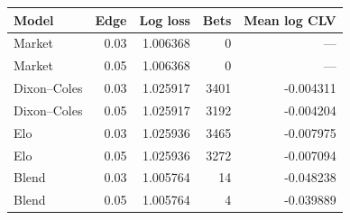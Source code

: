 \begin{tabular}{lrrrr}
\toprule
Model & Edge & Log loss & Bets & Mean log CLV \\
\midrule
Market & 0.03 & 1.006368 & 0 & --- \\
Market & 0.05 & 1.006368 & 0 & --- \\
Dixon--Coles & 0.03 & 1.025917 & 3401 & -0.004311 \\
Dixon--Coles & 0.05 & 1.025917 & 3192 & -0.004204 \\
Elo & 0.03 & 1.025936 & 3465 & -0.007975 \\
Elo & 0.05 & 1.025936 & 3272 & -0.007094 \\
Blend & 0.03 & 1.005764 & 14 & -0.048238 \\
Blend & 0.05 & 1.005764 & 4 & -0.039889 \\
\bottomrule
\end{tabular}
